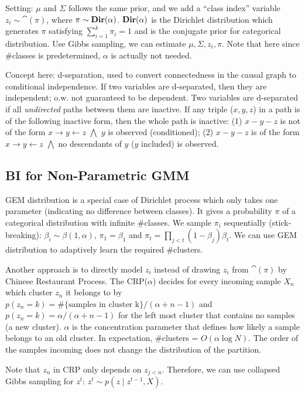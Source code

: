 Setting: $\mu$ and $\Sigma$ follows the same prior, and we add a ``class index'' variable $z_i\sim \cat(\pi)$, where $\pi\sim \operatorname{\textbf{Dir}}(\alpha)$. $\operatorname{\textbf{Dir}}(\alpha)$ is the Dirichlet distribution which generates $\pi$ satisfying $\sum_{i=1}^k \pi_i=1$ and is the conjugate prior for categorical distribution. Use Gibbs sampling, we can estimate $\mu, \Sigma, z_i, \pi$. Note that here since \#classes is predetermined, $\alpha$ is actually not needed.

Concept here: d-separation, used to convert connectedness in the causal graph to conditional independence. If two variables are d-separated, then they are independent; o.w. not guaranteed to be dependent. Two variables are d-separated if all \emph{undirected} paths between them are inactive. If any triple ($x,y,z$) in a path is of the following inactive form, then the whole path is inactive: (1) $x - y - z$ is not of the form $x \rightarrow y \leftarrow z$ $\bigwedge$ $y$ is observed (conditioned); (2) $x - y - z$ is of the form $x \rightarrow y \leftarrow z$ $\bigwedge$ no descendants of $y$ ($y$ included) is observed.

\subsection*{BI for Non-Parametric GMM}

GEM distribution is a special case of Dirichlet process which only takes one parameter (indicating no difference between classes). It gives a probability $\pi$ of a categorical distribution with infinite \#classes. We sample $\pi_i$ sequentially (stick-breaking): $\beta_i\sim \beta(1,\alpha)$, $\pi_1=\beta_1$ and $\pi_t=\prod_{j<t}(1-\beta_j)\beta_t$. We can use GEM distribution to adaptively learn the required \#clusters.

Another approach is to directly model $z_i$ instead of drawing $z_i$ from $\cat(\pi)$ by Chinese Restaurant Process. The CRP($\alpha$) decides for every incoming sample $X_n$ which cluster $z_n$ it belongs to by $p(z_n=k)=\#\text{\{samples in cluster k\}}/(\alpha+n-1)$ and $p(z_n=k)=\alpha/(\alpha+n-1)$ for the left most cluster that contains no samples (a new cluster). $\alpha$ is the concentration parameter that defines how likely a sample belongs to an old cluster. In expectation, \#clusters = $O(\alpha\log N)$. The order of the samples incoming does not change the distribution of the partition.

Note that $z_n$ in CRP only depends on $z_{j<n}$. Therefore, we can use collapsed Gibbs sampling for $z^t$: $z^t \sim p(z\mid z^{t-1}, X)$. 